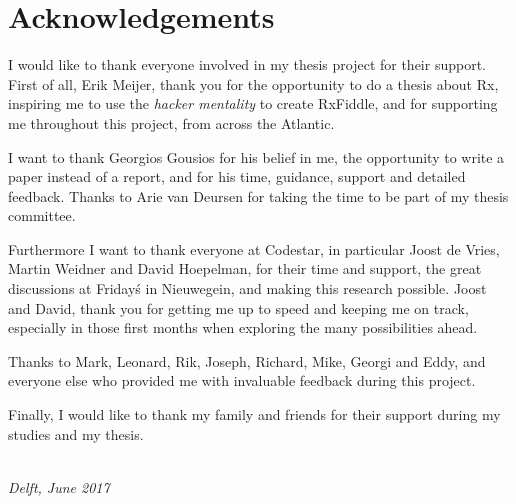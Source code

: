\chapter*{Acknowledgements}

I would like to thank everyone involved in my thesis project for their support.
First of all, Erik Meijer, thank you for the opportunity to do a thesis about Rx,
inspiring me to use the \emph{hacker mentality} to create RxFiddle, and for
supporting me throughout this project, from across the Atlantic.

I want to thank Georgios Gousios for his belief in me, the opportunity to write
a paper instead of a report, and for his time, guidance, support and detailed feedback.
Thanks to Arie van Deursen for taking the time to be part of my thesis committee.

Furthermore I want to thank everyone at Codestar, in particular Joost de Vries,
Martin Weidner and David Hoepelman, for their time and support, the great discussions
at Friday\'s in Nieuwegein, and making this research possible. Joost and David, thank
you for getting me up to speed and keeping me on track, especially in those first
months when exploring the many possibilities ahead.

Thanks to Mark, Leonard, Rik, Joseph, Richard, Mike, Georgi and Eddy, and everyone
else who provided me with invaluable feedback during this project.

Finally, I would like to thank my family and friends for their support during my studies and my thesis.

\begin{flushright}
{\makeatletter\itshape
    \@author \\
    Delft, June 2017
\makeatother}
\end{flushright}
